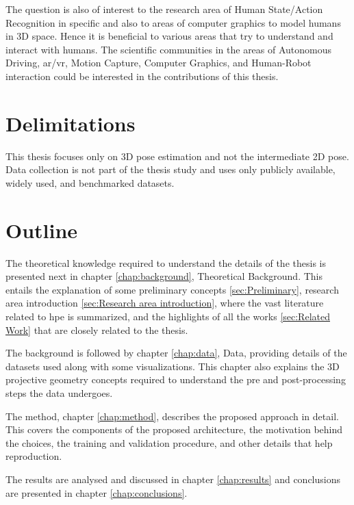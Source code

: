 The question is also of interest to the research area of Human State/Action Recognition in specific and also to areas of computer graphics to model humans in 3D space. Hence it is beneficial to various areas that try to understand and interact with humans. The scientific communities in the areas of Autonomous Driving, \ac{ar/vr}, Motion Capture, Computer Graphics, and Human-Robot interaction could be interested in the contributions of this thesis.

\section{Delimitations}
\label{sec:delimitations}
This thesis focuses only on 3D pose estimation and not the intermediate 2D pose. Data collection is not part of the thesis study and uses only publicly available, widely used, and benchmarked datasets.

\section{Outline}
\label{sec:outline}
The theoretical knowledge required to understand the details of the thesis is presented next in chapter \ref{chap:background}, Theoretical Background. This entails the explanation of some preliminary concepts \ref{sec:Preliminary}, research area introduction \ref{sec:Research area introduction}, where the vast literature related to \ac{hpe} is summarized, and the highlights of all the works \ref{sec:Related Work} that are closely related to the thesis.

The background is followed by chapter \ref{chap:data}, Data,  providing details of the datasets used along with some visualizations. This chapter also explains the 3D projective geometry concepts required to understand the pre and post-processing steps the data undergoes.

The method, chapter \ref{chap:method}, describes the proposed approach in detail. This covers the components of the proposed architecture, the motivation behind the choices, the training and validation procedure, and other details that help reproduction.

The results are analysed and discussed in chapter \ref{chap:results} and conclusions are presented in chapter \ref{chap:conclusions}.


